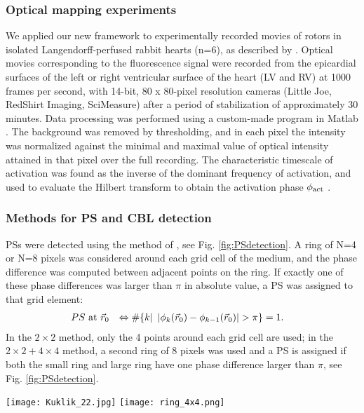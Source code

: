 \documentclass[aps,pre,amsfonts,amssymb,amsmath,twocolumn, superscriptaddress]{revtex4-1}
\newcommand{\phiact}{\ensuremath{\phi_{\rm act}}}
\begin{document}
\subsubsection{Optical mapping experiments} \label{sec:opticalmappingmethods} 

We applied our new framework to experimentally recorded movies of rotors in isolated Langendorff-perfused rabbit hearts (n=6), as described by \cite{Kulkarni:2018}. Optical movies corresponding
to the fluorescence signal were recorded from
the epicardial surfaces of the left or right ventricular surface of the heart (LV
and RV) at 1000 frames per second, with 14-bit,
80 x 80-pixel resolution cameras (Little Joe, RedShirt
Imaging, SciMeasure) after a period of stabilization of
approximately 30 minutes.  Data processing was performed using a custom-made program in Matlab \cite{matlab:2020}. The background was removed by thresholding, and in each pixel the intensity was normalized against the minimal and maximal value of optical intensity attained in that pixel over the full recording. The characteristic timescale of activation was found as the inverse of the  dominant frequency of activation, and used to evaluate the Hilbert transform to obtain the activation phase $\phiact$ \citep{Bray:2002}. 

\subsubsection{Methods for PS and CBL detection} \label{sec:PDLmethods} 

PSs were detected using the method of \cite{Kuklik:2017}, see Fig. \ref{fig:PSdetection}. A ring of N=4 or N=8 pixels was considered around each grid cell of the medium, and the phase difference was computed between adjacent points on the ring. If exactly one of these phase differences was larger than $\pi$ in absolute value, a PS was assigned to that grid element:
\begin{align}
PS\ \rm{at}&\  \vec{r}_0    &\Leftrightarrow   \# \{ k |\   \left| \phi_k(\vec{r}_0) - \phi_{k-1}(\vec{r}_0) \right| > \pi \} &=1. 
\end{align}
In the $2\times 2$ method, only the 4 points around each grid cell are used; in the $2\times 2 + 4 \times 4$ method, a second ring of 8 pixels was used and a PS is assigned if both the small ring and large ring have one phase difference larger than $\pi$, see Fig. \ref{fig:PSdetection}.  

\begin{figure*}
    \centering
    \texttt{[image: Kuklik\_22.jpg]}
    \texttt{[image: ring\_4x4.png]}
    \caption{Method of PS detection by \cite{Kuklik:2017} as used in this paper. Phase differences are considered between pairs of points on a ring of 4 points (left, $2\times 2$ method) or 8 points (right, $4\times 4$ method), to assess whether a PS is present at the central location. }
    \label{fig:PSdetection}
\end{figure*}
    
\end{document}
